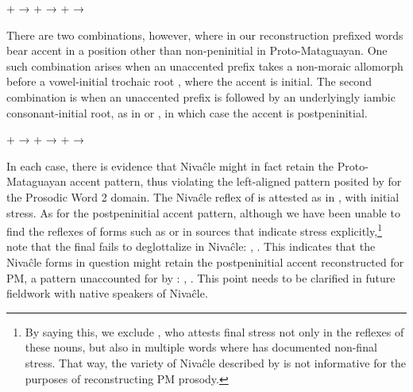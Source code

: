 \ea
    \begin{xlist}
        \ex {} +  → 
        \ex {} +  → 
        \ex {} +  → 
    \end{xlist}
\z
{}

There are two combinations, however, where in our reconstruction prefixed words bear accent in a position other than non-peninitial in Proto-Mataguayan. One such combination arises when an unaccented prefix takes a non-moraic allomorph before a vowel-initial trochaic root , where the accent is initial. The second combination is when an unaccented prefix is followed by an underlyingly iambic consonant-initial root, as in  or , in which case the accent is postpeninitial.

\ea
    \begin{xlist}
        \ex {} +  →  \label{pm-lhôse}
        \ex {} +  →  \label{pm-yichita'}
        \ex {} +  →  \label{pm-acaclô'}
    \end{xlist}
\z
{}

In each case, there is evidence that Nivaĉle might in fact retain the Proto-Mataguayan accent pattern, thus violating the left-aligned pattern posited by \citet{AnG15} for the Prosodic Word 2 domain. The Nivaĉle reflex of  is attested as  in \citet[38]{AnG15}, with initial stress. As for the postpeninitial accent pattern, although we have been unable to find the reflexes of forms such as  or  in sources that indicate stress explicitly,\footnote{By saying this, we exclude \citet{NS87}, who attests final stress not only in the reflexes of these nouns, but also in multiple words where \citet{AnG15} has documented non-final stress. That way, the variety of Nivaĉle described by \citet{NS87} is not informative for the purposes of reconstructing PM prosody.} note that the final  fails to deglottalize in Nivaĉle: ,  \citep[56, 103]{JS16}. This indicates that the Nivaĉle forms in question might retain the postpeninitial accent reconstructed for PM, a pattern unaccounted for by \citet{AnG15}: , . This point needs to be clarified in future fieldwork with native speakers of Nivaĉle.

